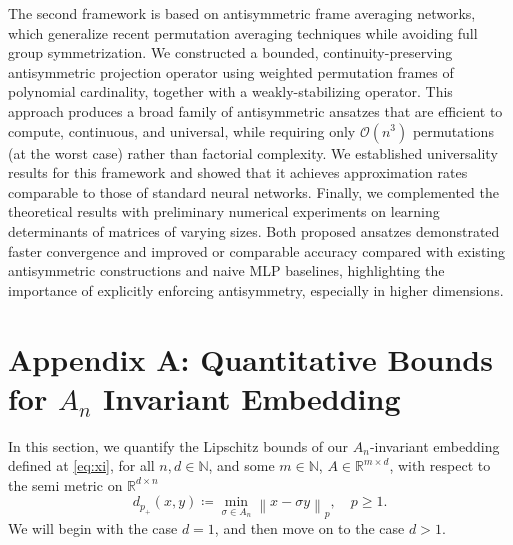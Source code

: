 \documentclass{amsart}
\theoremstyle{plain}
\theoremstyle{definition}
\theoremstyle{remark}
\newcommand{\RR}{\mathbb{R}}
\newcommand{\NN}{\mathbb{N}}
\begin{document}
The second framework is based on antisymmetric frame averaging networks, which generalize recent permutation averaging techniques while avoiding full group symmetrization. We constructed a bounded, continuity-preserving antisymmetric projection operator using weighted permutation frames of polynomial cardinality, together with a weakly-stabilizing operator. This approach produces a broad family of antisymmetric ansatzes that are efficient to compute, continuous, and universal, while requiring only $\mathcal{O}(n^3)$ permutations (at the worst case) rather than factorial complexity. We established universality results for this framework and showed that it achieves approximation rates comparable to those of standard neural networks. Finally, we complemented the theoretical results with preliminary numerical experiments on learning determinants of matrices of varying sizes. Both proposed ansatzes demonstrated faster convergence and improved or comparable accuracy compared with existing antisymmetric constructions and naive MLP baselines, highlighting the importance of explicitly enforcing antisymmetry, especially in higher dimensions.

\section{Appendix A: Quantitative Bounds for $A_n$ Invariant Embedding} \label{sec:appendixA}
In this section, we quantify the Lipschitz bounds of our $A_n$-invariant embedding defined at \eqref{eq:xi}, for all $n, d \in \NN$, and some $m \in \NN$, $A \in \RR^{m \times d}$, with respect to the semi metric on $\RR^{d \times n}$ 
\begin{equation}
    d_{p_{+}}(x, y) \coloneq \min_{\sigma \in A_n}{\left\|x - \sigma y \right\|_p}, \quad p \geq 1.
\end{equation}
We will begin with the case $d=1$, and then move on to the case $d>1$.
\end{document}
